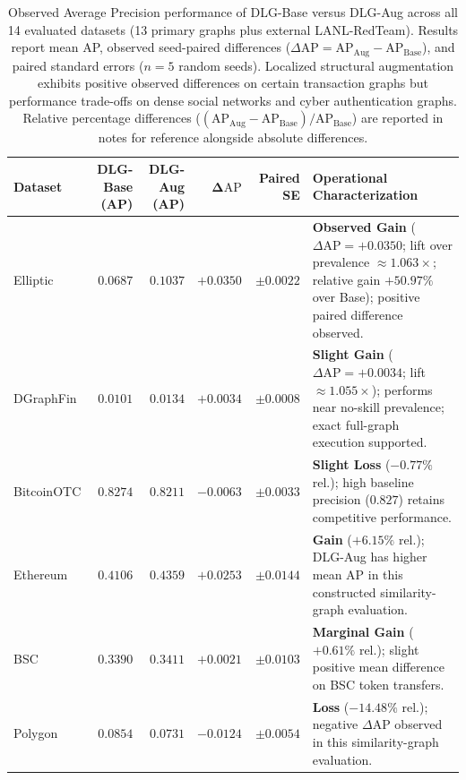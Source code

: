 \documentclass[applsci,article,submit,moreauthors,pdftex]{Definitions/mdpi}
\begin{document}
\begin{table}[htbp]
\centering\fontsize{7.6pt}{8.9pt}\selectfont\setlength{\tabcolsep}{4pt}\renewcommand{\arraystretch}{0.92}
\renewcommand{\arraystretch}{0.92}
\caption{Observed Average Precision performance of DLG-Base versus DLG-Aug across all 14 evaluated datasets (13 primary graphs plus external LANL-RedTeam). Results report mean AP, observed seed-paired differences ($\Delta\mathrm{AP} = \mathrm{AP}_{\mathrm{Aug}} - \mathrm{AP}_{\mathrm{Base}}$), and paired standard errors ($n=5$ random seeds). Localized structural augmentation exhibits positive observed differences on certain transaction graphs but performance trade-offs on dense social networks and cyber authentication graphs. Relative percentage differences ($(\mathrm{AP}_{\mathrm{Aug}} - \mathrm{AP}_{\mathrm{Base}})/\mathrm{AP}_{\mathrm{Base}}$) are reported in notes for reference alongside absolute differences.}
\label{tab:conditional_delta}
\begin{tabularx}{\textwidth}{lrrrr>{\raggedright\arraybackslash}X}\toprule
\textbf{Dataset} & \textbf{DLG-Base (AP)} & \textbf{DLG-Aug (AP)} & $\mathbf{\Delta\mathrm{AP}}$ & \textbf{Paired SE} & \textbf{Operational Characterization} \\\midrule
Elliptic & $0.0687$ & $0.1037$ & $\mathbf{+0.0350}$ & $\pm 0.0022$ & \textbf{Observed Gain} ($\Delta\mathrm{AP} = +0.0350$; lift over prevalence $\approx 1.063\times$; relative gain $+50.97\%$ over Base); positive paired difference observed. \\
DGraphFin & $0.0101$ & $0.0134$ & $+0.0034$ & $\pm 0.0008$ & \textbf{Slight Gain} ($\Delta\mathrm{AP} = +0.0034$; lift $\approx 1.055\times$); performs near no-skill prevalence; exact full-graph execution supported. \\
BitcoinOTC & $0.8274$ & $0.8211$ & $-0.0063$ & $\pm 0.0033$ & \textbf{Slight Loss} ($-0.77\%$ rel.); high baseline precision ($0.827$) retains competitive performance. \\
Ethereum & $0.4106$ & $0.4359$ & $\mathbf{+0.0253}$ & $\pm 0.0144$ & \textbf{Gain} ($+6.15\%$ rel.); DLG-Aug has higher mean AP in this constructed similarity-graph evaluation. \\
BSC & $0.3390$ & $0.3411$ & $+0.0021$ & $\pm 0.0103$ & \textbf{Marginal Gain} ($+0.61\%$ rel.); slight positive mean difference on BSC token transfers. \\
Polygon & $0.0854$ & $0.0731$ & $-0.0124$ & $\pm 0.0054$ & \textbf{Loss} ($-14.48\%$ rel.); negative $\Delta\mathrm{AP}$ observed in this similarity-graph evaluation. \\

\end{tabularx}
\end{table}
\end{document}
